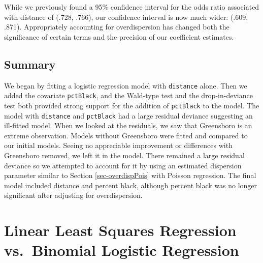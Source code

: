 \documentclass[
]{krantz}
\begin{document}
While we previously found a 95\% confidence interval for the odds ratio associated with distance of (.728, .766), our confidence interval is now much wider: (.609, .871). Appropriately accounting for overdispersion has changed both the significance of certain terms and the precision of our coefficient estimates.

\hypertarget{summary}{%
\subsection{Summary}\label{summary}}

We began by fitting a logistic regression model with \texttt{distance} alone. Then we added the covariate \texttt{pctBlack}, and the Wald-type test and the drop-in-deviance test both provided strong support for the addition of \texttt{pctBlack} to the model. The model with \texttt{distance} and \texttt{pctBlack} had a large residual deviance suggesting an ill-fitted model. When we looked at the residuals, we saw that Greensboro is an extreme observation. Models without Greensboro were fitted and compared to our initial models. Seeing no appreciable improvement or differences with Greensboro removed, we left it in the model. There remained a large residual deviance so we attempted to account for it by using an estimated dispersion parameter similar to Section \ref{sec-overdispPois} with Poisson regression. The final model included distance and percent black, although percent black was no longer significant after adjusting for overdispersion.

\hypertarget{linear-least-squares-regression-vs.-binomial-logistic-regression}{%
\section{\texorpdfstring{Linear Least Squares Regression  vs.~Binomial Logistic Regression }{Linear Least Squares Regression  vs.~Binomial Logistic Regression }}\label{linear-least-squares-regression-vs.-binomial-logistic-regression}}
\end{document}
